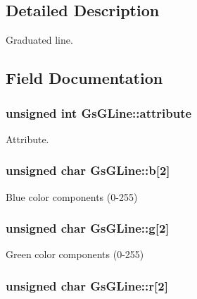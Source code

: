 \subsection{Detailed Description}
Graduated line. 

\subsection{Field Documentation}
\hypertarget{structGsGLine_a075bc0bffec511d2f197127de13c8a0c}{}
\subsubsection[{attribute}]{\setlength{\rightskip}{0pt plus 5cm}unsigned int Gs\+G\+Line\+::attribute}\label{structGsGLine_a075bc0bffec511d2f197127de13c8a0c}


Attribute. 

\hypertarget{structGsGLine_a1d749e52beea52a8da21ea04e70305c6}{}
\subsubsection[{b}]{\setlength{\rightskip}{0pt plus 5cm}unsigned char Gs\+G\+Line\+::b\mbox{[}2\mbox{]}}\label{structGsGLine_a1d749e52beea52a8da21ea04e70305c6}


Blue color components (0-\/255) 

\hypertarget{structGsGLine_aa28614d6f820d65fe7e0146e11879f2f}{}
\subsubsection[{g}]{\setlength{\rightskip}{0pt plus 5cm}unsigned char Gs\+G\+Line\+::g\mbox{[}2\mbox{]}}\label{structGsGLine_aa28614d6f820d65fe7e0146e11879f2f}


Green color components (0-\/255) 

\hypertarget{structGsGLine_a769bcc099496430e50455ff903469be6}{}
\subsubsection[{r}]{\setlength{\rightskip}{0pt plus 5cm}unsigned char Gs\+G\+Line\+::r\mbox{[}2\mbox{]}}\label{structGsGLine_a769bcc099496430e50455ff903469be6}


